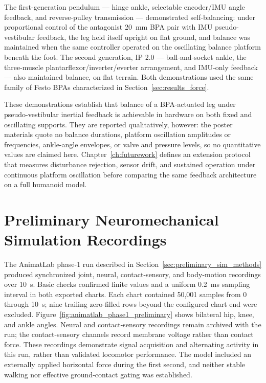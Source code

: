 The first-generation pendulum --- hinge ankle, selectable encoder/IMU angle feedback, and reverse-pulley transmission --- demonstrated self-balancing: under proportional control of the antagonist \qty{20}{\mm} BPA pair with IMU pseudo-vestibular feedback, the leg held itself upright on flat ground, and balance was maintained when the same controller operated on the oscillating balance platform beneath the foot. The second generation, IP 2.0 --- ball-and-socket ankle, the three-muscle plantarflexor/inverter/everter arrangement, and IMU-only feedback --- also maintained balance, on flat terrain. Both demonstrations used the same family of Festo BPAs characterized in Section~\ref{sec:results_force}.

These demonstrations establish that balance of a BPA-actuated leg under pseudo-vestibular inertial feedback is achievable in hardware on both fixed and oscillating supports. They are reported qualitatively, however: the poster materials quote no balance durations, platform oscillation amplitudes or frequencies, ankle-angle envelopes, or valve and pressure levels, so no quantitative values are claimed here. Chapter~\ref{ch:futurework} defines an extension protocol that measures disturbance rejection, sensor drift, and sustained operation under continuous platform oscillation before comparing the same feedback architecture on a full humanoid model.

\section{Preliminary Neuromechanical Simulation Recordings}\label{sec:preliminary_sim_results}

The AnimatLab phase-1 run described in Section~\ref{sec:preliminary_sim_methods} produced synchronized joint, neural, contact-sensory, and body-motion recordings over \qty{10}{\second}. Basic checks confirmed finite values and a uniform \qty{0.2}{\milli\second} sampling interval in both exported charts. Each chart contained 50,001 samples from 0 through \qty{10}{\second}; nine trailing zero-filled rows beyond the configured chart end were excluded. Figure~\ref{fig:animatlab_phase1_preliminary} shows bilateral hip, knee, and ankle angles. Neural and contact-sensory recordings remain archived with the run; the contact-sensory channels record membrane voltage rather than contact force. These recordings demonstrate signal acquisition and alternating activity in this run, rather than validated locomotor performance. The model included an externally applied horizontal force during the first second, and neither stable walking nor effective ground-contact gating was established.

